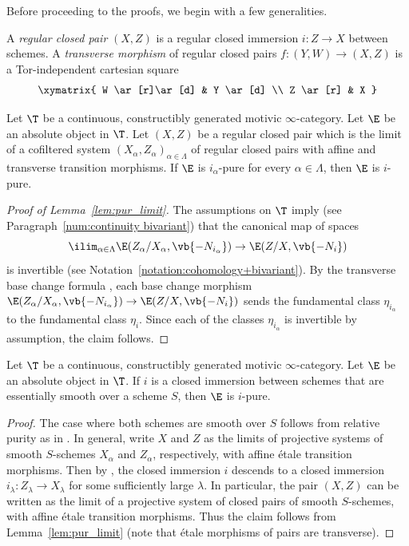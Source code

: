 Before proceeding to the proofs, we begin with a few generalities.

\begin{df}
\label{df:trans_cl_pair}
A \emph{regular closed pair} $(X,Z)$ is a regular closed immersion \hbox{$i\!:\!Z\!\to\!X$} between schemes. A \emph{transverse morphism} of regular closed pairs $f:(Y,W)\to (X,Z)$ is a Tor-independent cartesian square
\begin{equation*}
\xymatrix{
W \ar[r]\ar[d]
& Y \ar[d]
\\
Z \ar[r]
& X
}
\end{equation*}
\end{df}

\begin{lm}
\label{lem:pur_limit}
Let $\T$ be a continuous, constructibly generated motivic $\infty$-category.
Let $\E$ be an absolute object in $\T$.
Let $(X,Z)$ be a regular closed pair which is the limit of a cofiltered system $(X_\alpha,Z_\alpha)_{\alpha\in\Lambda}$ of regular closed pairs with affine and transverse transition morphisms.
If $\E$ is $i_\alpha$-pure for every $\alpha\in\Lambda$, then $\E$ is $i$-pure.
\end{lm}

\begin{proof}[Proof of Lemma~\ref{lem:pur_limit}]
The assumptions on $\T$ imply (see Paragraph~\ref{num:continuity bivariant}) that the canonical map of spaces
\begin{equation*}
\ilim_{\alpha\in\Lambda} \E(Z_\alpha/X_\alpha, \vb{-N_{i_\alpha}}) \to \E(Z/X, \vb{-N_i})
\end{equation*}
is invertible (see Notation~\ref{notation:cohomology+bivariant}).
By the transverse base change formula \cite[Th.\,3.2.21]{DJK}, each base change morphism $\E(Z_\alpha/X_\alpha, \vb{-N_{i_\alpha}}) \to \E(Z/X, \vb{-N_i})$ sends the fundamental class $\eta_{i_\alpha}$ to the fundamental class $\eta_i$.
Since each of the classes $\eta_{i_\alpha}$ is invertible by assumption, the claim follows.
\end{proof}

\begin{lm}
\label{lm:pur_ess_sm}
Let $\T$ be a continuous, constructibly generated motivic $\infty$-category.
Let $\E$ be an absolute object in $\T$.
If $i$ is a closed immersion between schemes that are essentially smooth over a scheme $S$, then $\E$ is $i$-pure.
\end{lm}
\begin{proof}
The case where both schemes are smooth over $S$ follows from relative purity as in \cite[Prop.\,4.3.10(i)]{DJK}.
In general, write $X$ and $Z$ as the limits of projective systems of smooth $S$-schemes $X_\alpha$ and $Z_\alpha$, respectively, with affine étale transition morphisms.
Then by \cite[Th.\,8.8.2(ii), Prop.\,8.6.3]{EGA4}, the closed immersion $i$ descends to a closed immersion $i_\lambda : Z_\lambda \to X_\lambda$ for some sufficiently large $\lambda$.
In particular, the pair $(X, Z)$ can be written as the limit of a projective system of closed pairs of smooth $S$-schemes, with affine étale transition morphisms.
Thus the claim follows from Lemma~\ref{lem:pur_limit} (note that étale morphisms of pairs are transverse).
\end{proof}

